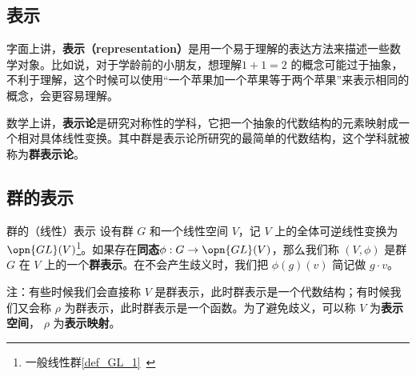 

\subsection{表示}

字面上讲，\textbf{表示（representation）}是用一个易于理解的表达方法来描述一些数学对象。比如说，对于学龄前的小朋友，想理解$1+1=2$ 的概念可能过于抽象，不利于理解，这个时候可以使用“一个苹果加一个苹果等于两个苹果”来表示相同的概念，会更容易理解。

数学上讲，\textbf{表示论}是研究对称性的学科，它把一个抽象的代数结构的元素映射成一个相对具体线性变换。其中群是表示论所研究的最简单的代数结构，这个学科就被称为\textbf{群表示论}。\cite{GTM222}\cite{维声表示}

\subsection{群的表示}

% 
% 
% 
% 

\begin{definition}{群的（线性）表示}
设有群 $G$ 和一个线性空间 $V$，记 $V$ 上的全体可逆线性变换为 $\opn{GL}(V)$\footnote{一般线性群\autoref{def_GL_1}~}。如果存在\textbf{同态}$\phi: G\rightarrow \opn{GL}(V)$，那么我们称 $(V, \phi)$ 是群 $G$ 在 $V$ 上的一个\textbf{群表示}。在不会产生歧义时，我们把 $\phi(g)(v)$ 简记做 $g \cdot v$。
\end{definition}


注：有些时候我们会直接称 $V$ 是群表示，此时群表示是一个代数结构；有时候我们又会称 $\rho$ 为群表示，此时群表示是一个函数。为了避免歧义，可以称 $V$ 为\textbf{表示空间}， $\rho$ 为\textbf{表示映射}。

